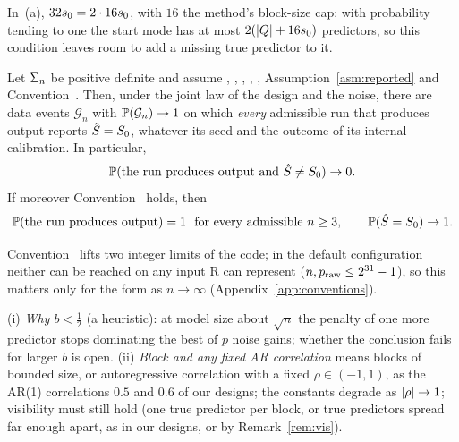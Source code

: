 In~(a), $32\sz=2\cdot16\sz$, with $16$ the method's block-size cap: with probability tending to one the start mode has at
most $2(\abs{Q}+16\sz)$ predictors, so this condition leaves room to add a missing true predictor to it.

\begin{theorem}\label{thm:reported}
Let $\Sig$ be positive definite and assume , , , , , Assumption~\ref{asm:reported}
and Convention~. Then, under the joint law of the design and the noise, there are data events $\mathcal G_n$ with
$\P(\mathcal G_n)\to1$ on which \emph{every} admissible run that produces output reports $\Shat=\Sz$, whatever its seed and the
outcome of its internal calibration. In particular,
\begin{equation}\label{eq:reported}
  \P(\text{the run produces output and }\Shat\neq\Sz)\to0 .
\end{equation}
If moreover Convention~ holds, then
\begin{equation}\label{eq:delivery}
  \P(\text{the run produces output})=1\ \ \text{for every admissible }n\ge3,\qquad \P(\Shat=\Sz)\to1 .
\end{equation}
\end{theorem}

Convention~ lifts two integer limits of the code; in the default configuration neither can be reached on any input
R can represent ($n,\praw\le2^{31}-1$), so this matters only for the form as $n\to\infty$ (Appendix~\ref{app:conventions}).



\begin{remark}\label{rem:reported}
(i) \emph{Why $b<\tfrac12$} (a heuristic): at model size about $\sqrt n$ the penalty of one more predictor stops dominating
the best of $p$ noise gains; whether the conclusion fails for larger $b$ is open.
(ii) \emph{Block and any fixed AR correlation} means blocks of bounded size, or autoregressive correlation with a fixed
$\rho\in(-1,1)$, as the AR(1) correlations $0.5$ and $0.6$ of our designs; the constants degrade as $\abs\rho\to1$; visibility must still hold (one true predictor per
block, or true predictors spread far enough apart, as in our designs, or by Remark~\ref{rem:vis}).
\end{remark}

